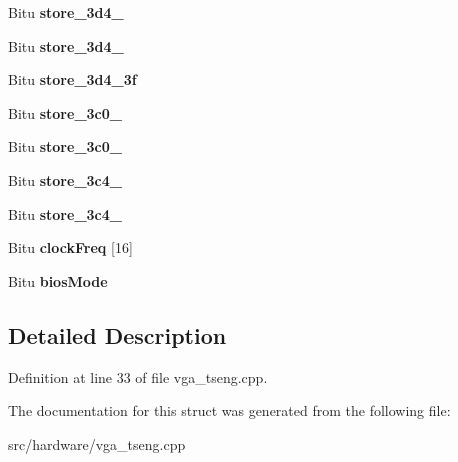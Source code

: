\begin{DoxyCompactItemize}
\item 
\hypertarget{structSVGA__ET4K__DATA_ac2f37789cc11d0f05eca2405c5ecfeef}{Bitu {\bfseries store\-\_\-3d4\-\_}}\label{structSVGA__ET4K__DATA_ac2f37789cc11d0f05eca2405c5ecfeef}

\item 
\hypertarget{structSVGA__ET4K__DATA_a54c31aecb3874934ea98d9b7a34e5d7d}{Bitu {\bfseries store\-\_\-3d4\-\_}}\label{structSVGA__ET4K__DATA_a54c31aecb3874934ea98d9b7a34e5d7d}

\item 
\hypertarget{structSVGA__ET4K__DATA_aeae2883343db7b4091e4be965d8c6994}{Bitu {\bfseries store\-\_\-3d4\-\_\-3f}}\label{structSVGA__ET4K__DATA_aeae2883343db7b4091e4be965d8c6994}

\item 
\hypertarget{structSVGA__ET4K__DATA_a4552f591ad9789ff48b0468b78cacf25}{Bitu {\bfseries store\-\_\-3c0\-\_}}\label{structSVGA__ET4K__DATA_a4552f591ad9789ff48b0468b78cacf25}

\item 
\hypertarget{structSVGA__ET4K__DATA_a2c87e9738273fb95c3798a8c606c6080}{Bitu {\bfseries store\-\_\-3c0\-\_}}\label{structSVGA__ET4K__DATA_a2c87e9738273fb95c3798a8c606c6080}

\item 
\hypertarget{structSVGA__ET4K__DATA_af503b310e8174711431ad0a048789b3e}{Bitu {\bfseries store\-\_\-3c4\-\_}}\label{structSVGA__ET4K__DATA_af503b310e8174711431ad0a048789b3e}

\item 
\hypertarget{structSVGA__ET4K__DATA_a8744b13458d800ff67526becef7cc1db}{Bitu {\bfseries store\-\_\-3c4\-\_}}\label{structSVGA__ET4K__DATA_a8744b13458d800ff67526becef7cc1db}

\item 
\hypertarget{structSVGA__ET4K__DATA_a48c8bfb845bbdb81a38b90732c058ca9}{Bitu {\bfseries clock\-Freq} \mbox{[}16\mbox{]}}\label{structSVGA__ET4K__DATA_a48c8bfb845bbdb81a38b90732c058ca9}

\item 
\hypertarget{structSVGA__ET4K__DATA_a21a1d84ea5f560d5eb9928a45ed8f8e2}{Bitu {\bfseries bios\-Mode}}\label{structSVGA__ET4K__DATA_a21a1d84ea5f560d5eb9928a45ed8f8e2}

\end{DoxyCompactItemize}


\subsection{Detailed Description}


Definition at line 33 of file vga\-\_\-tseng.\-cpp.



The documentation for this struct was generated from the following file\-:\begin{DoxyCompactItemize}
\item 
src/hardware/vga\-\_\-tseng.\-cpp\end{DoxyCompactItemize}
